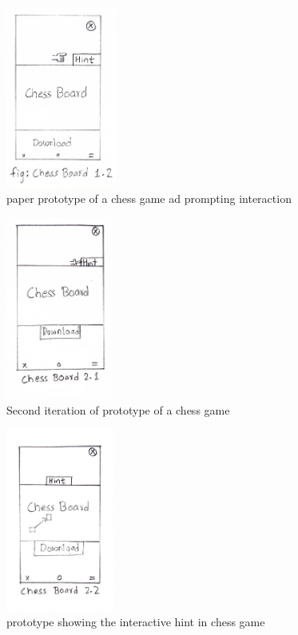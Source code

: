 \documentclass[journal]{IEEEtran}
\begin{document}
\begin{figure}[H]
    \centering
    \includegraphics[height=6cm]{chess2.jpg}
    \caption{paper prototype of a chess game ad prompting interaction}
\end{figure}

\begin{figure}[H]
    \centering
    \includegraphics[height=6cm]{chess3.jpg}
    \caption{Second iteration of prototype of a chess game}
\end{figure}

\begin{figure}[H]
    \centering
    \includegraphics[height=6cm]{chess4.jpg}
    \caption{prototype showing the interactive hint in chess game}
\end{figure}
\end{document}
